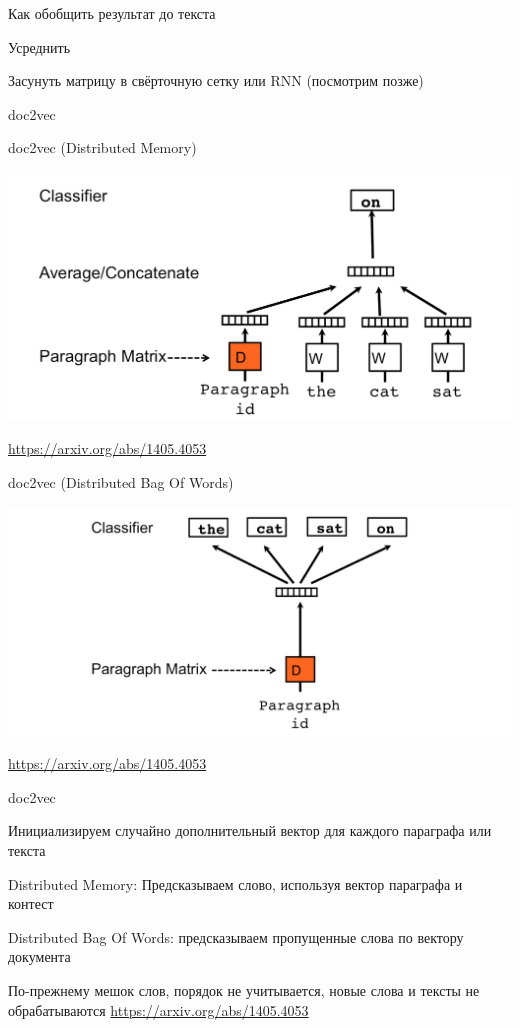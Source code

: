 \documentclass[notes,12pt, aspectratio=169]{beamer}
\newenvironment{wideitemize}{\itemize\addtolength{\itemsep}{10pt}}{\enditemize}
\begin{document}
\begin{frame}{Как обобщить результат до текста}
	\begin{wideitemize} 
		\item  Усреднить
		\item  Засунуть матрицу в свёрточную сетку или RNN (посмотрим позже)
		\item   doc2vec 
	\end{wideitemize} 
\end{frame} 


\begin{frame}{doc2vec (Distributed Memory)}
	\begin{center}
		\includegraphics[width=.75\linewidth]{doc2vec1.png}
	\end{center}
	\vfill
	\footnotesize  {\color{blue} \url{https://arxiv.org/abs/1405.4053}}
\end{frame} 


\begin{frame}{doc2vec (Distributed Bag Of Words)}
	\begin{center}
		\includegraphics[width=.8\linewidth]{doc2vec2.png}
	\end{center}
	\vfill
	\footnotesize  {\color{blue} \url{https://arxiv.org/abs/1405.4053}}
\end{frame} 


\begin{frame}{doc2vec}
	\begin{wideitemize} 
		\item  Инициализируем случайно дополнительный вектор для каждого параграфа или текста
		\item \alert{Distributed Memory:}  Предсказываем слово, используя вектор параграфа и контест
		\item  \alert{Distributed Bag Of Words:} предсказываем пропущенные слова по вектору документа
		\item  По-прежнему мешок слов, порядок не учитывается, новые слова и тексты не обрабатываются
	\end{wideitemize} 
	\vfill
	\footnotesize  {\color{blue} \url{https://arxiv.org/abs/1405.4053}}
\end{frame} 
\end{document}
